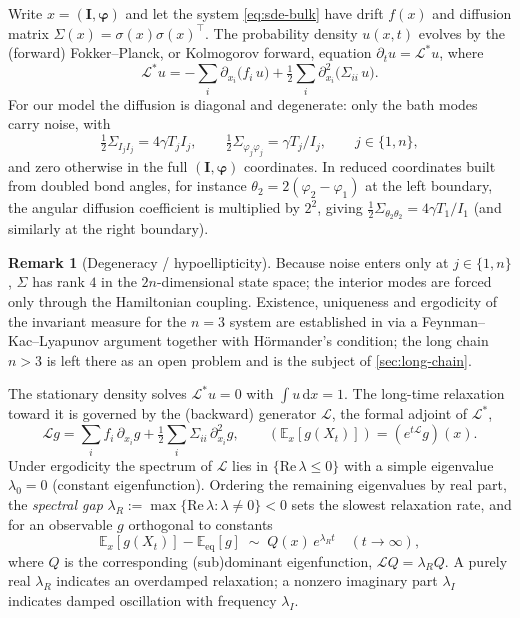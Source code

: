 \documentclass[11pt,a4paper]{article}
\theoremstyle{definition}
\newtheorem{remark}[theorem]{Remark}
\newcommand{\E}{\mathbb{E}}
\newcommand{\dd}{\,\mathrm{d}}
\numberwithin{equation}{section}   %
\newcommand{\bI}{\mathbf{I}}
\newcommand{\bphi}{\boldsymbol{\varphi}}
\newcommand{\Lgen}{\mathcal{L}}
\newcommand{\Ladj}{\mathcal{L}^{*}}
\begin{document}
Write $x=(\bI,\bphi)$ and let the system \eqref{eq:sde-bulk} have drift $f(x)$
and diffusion matrix $\Sigma(x)=\sigma(x)\sigma(x)^{\!\top}$. The probability
density $u(x,t)$ evolves by the (forward) Fokker--Planck, or Kolmogorov forward,
equation $\partial_t u = \Ladj u$, where
\begin{equation}\label{eq:fp-operator}
  \Ladj u = -\sum_i \partial_{x_i}\!\big(f_i\,u\big)
            + \tfrac12\sum_{i} \partial^{2}_{x_i}\!\big(\Sigma_{ii}\,u\big).
\end{equation}
For our model the diffusion is diagonal and degenerate: only the bath modes
carry noise, with
\begin{equation}\label{eq:diffusion}
  \tfrac12\Sigma_{I_j I_j} = 4\gamma T_j I_j, \qquad
  \tfrac12\Sigma_{\varphi_j\varphi_j} = \gamma T_j/I_j,
  \qquad j\in\{1,n\},
\end{equation}
and zero otherwise in the full $(\bI,\bphi)$ coordinates. In reduced
coordinates built from doubled bond angles, for instance
$\theta_2=2(\varphi_2-\varphi_1)$ at the left boundary, the angular diffusion
coefficient is multiplied by $2^2$, giving
$\tfrac12\Sigma_{\theta_2\theta_2}=4\gamma T_1/I_1$ (and similarly at the right
boundary).

\begin{remark}[Degeneracy / hypoellipticity]\label{rem:hypo}
Because noise enters only at $j\in\{1,n\}$, $\Sigma$ has rank $4$ in the
$2n$-dimensional state space; the interior modes are forced only through the
Hamiltonian coupling. Existence, uniqueness and ergodicity of the invariant
measure for the $n=3$ system are established in \cite{HLNS} via a
Feynman--Kac--Lyapunov argument together with H\"ormander's condition; the long
chain $n>3$ is left there as an open problem and is the subject of
\cref{sec:long-chain}.
\end{remark}

The stationary density solves $\Ladj u = 0$ with $\int u\dd x = 1$. The
long-time relaxation toward it is governed by the (backward) generator $\Lgen$,
the formal adjoint of $\Ladj$,
\begin{equation}\label{eq:generator}
  \Lgen g = \sum_i f_i\,\partial_{x_i} g
          + \tfrac12\sum_i \Sigma_{ii}\,\partial^2_{x_i} g,
  \qquad
  (\E_x[g(X_t)]) = (e^{t\Lgen} g)(x).
\end{equation}
Under ergodicity the spectrum of $\Lgen$ lies in $\{\mathrm{Re}\,\lambda\le 0\}$
with a simple eigenvalue $\lambda_0=0$ (constant eigenfunction). Ordering the
remaining eigenvalues by real part, the \emph{spectral gap}
$\lambda_R := \max\{\mathrm{Re}\,\lambda : \lambda\neq 0\}<0$ sets the slowest
relaxation rate, and for an observable $g$ orthogonal to constants
\begin{equation}\label{eq:decay}
  \E_x[g(X_t)] - \E_{\mathrm{eq}}[g]
  \;\sim\; Q(x)\,e^{\lambda_R t}\quad (t\to\infty),
\end{equation}
where $Q$ is the corresponding (sub)dominant eigenfunction, $\Lgen Q =
\lambda_R Q$. A purely real $\lambda_R$ indicates an overdamped relaxation; a
nonzero imaginary part $\lambda_I$ indicates damped oscillation with frequency
$\lambda_I$.
\end{document}
